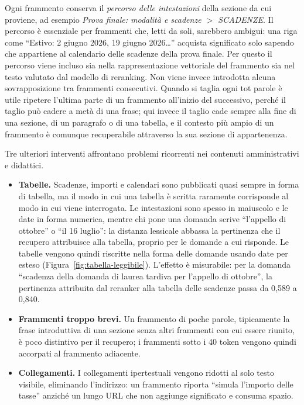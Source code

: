 Ogni frammento conserva il \emph{percorso delle intestazioni} della sezione da cui proviene, ad esempio
\emph{Prova finale: modalità e scadenze $>$ SCADENZE}. Il percorso è essenziale per frammenti che, letti da soli,
sarebbero ambigui: una riga come ``Estivo: 2 giugno 2026, 19 giugno 2026\dots'' acquista significato solo sapendo
che appartiene al calendario delle scadenze della prova finale. Per questo il percorso viene incluso sia nella
rappresentazione vettoriale del frammento sia nel testo valutato dal modello di reranking. Non viene invece
introdotta alcuna sovrapposizione tra frammenti consecutivi. Quando si taglia ogni tot parole è utile ripetere
l'ultima parte di un frammento all'inizio del successivo, perché il taglio può cadere a metà di una frase; qui
invece il taglio cade sempre alla fine di una sezione, di un paragrafo o di una tabella, e il contesto più ampio di
un frammento è comunque recuperabile attraverso la sua sezione di appartenenza.

Tre ulteriori interventi affrontano problemi ricorrenti nei contenuti amministrativi e didattici.

\begin{itemize}
  \item \textbf{Tabelle.} Scadenze, importi e calendari sono pubblicati quasi sempre in forma di tabella, ma il
  modo in cui una tabella è scritta raramente corrisponde al modo in cui viene interrogata. Le intestazioni sono
  spesso in maiuscolo e le date in forma numerica, mentre chi pone una domanda scrive ``l'appello di ottobre'' o ``il
  16 luglio'': la distanza lessicale abbassa la pertinenza che il recupero attribuisce alla tabella, proprio per le
  domande a cui risponde. Le tabelle vengono quindi riscritte nella forma delle domande usando
  date per esteso (Figura~\ref{fig:tabella-leggibile}). L'effetto è misurabile: per la domanda ``scadenza della domanda
  di laurea tardiva per l'appello di ottobre'', la pertinenza attribuita dal reranker alla tabella delle scadenze
  passa da 0,589 a 0,840.
  \item \textbf{Frammenti troppo brevi.} Un frammento di poche parole, tipicamente la frase introduttiva di una
  sezione senza altri frammenti con cui essere riunito, è poco distintivo per il recupero; i frammenti sotto i 40
  token vengono quindi accorpati al frammento adiacente.
  \item \textbf{Collegamenti.} I collegamenti ipertestuali vengono ridotti al solo testo visibile, eliminando
  l'indirizzo: un frammento riporta ``simula l'importo delle tasse'' anziché un lungo URL che non aggiunge
  significato e consuma spazio.
\end{itemize}

